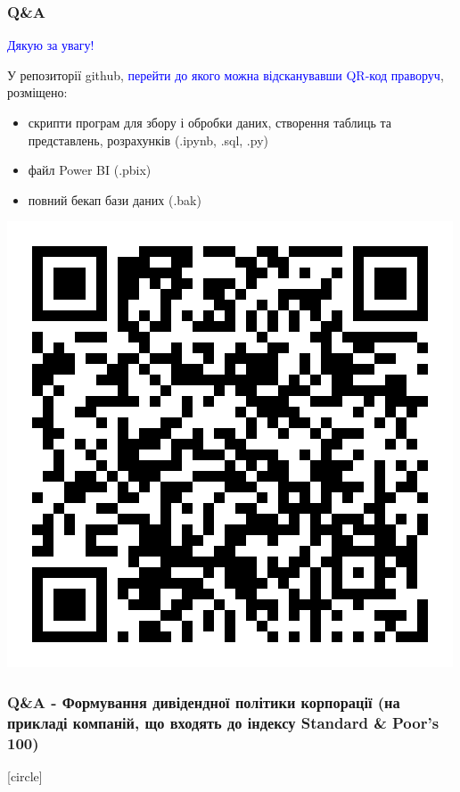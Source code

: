 \documentclass[aspectratio=169]{beamer}
\begin{document}
\begin{frame}
\frametitle{Q\&A}
\begin{center}
\bigskip
\textcolor{blue}{\huge Дякую за увагу!} \\
\end{center}
\begin{multicols}{2}

\vbox{\vspace{0.1cm}}
У репозиторії github, \textcolor{blue}{перейти до якого можна відсканувавши QR-код праворуч}, розміщено:
\begin{itemize}
\item скрипти програм для збору і обробки даних, створення таблиць та представлень, розрахунків (.ipynb, .sql, .py)
\item файл Power BI (.pbix)
\item повний бекап бази даних (.bak) 
\end{itemize}
\columnbreak
\hspace{5mm}
\includegraphics[scale=0.35]{QR code.png}
\end{multicols}
\end{frame}

\begin{frame}
\frametitle {Q\&A - Формування дивідендної політики корпорації (на прикладі компаній, що входять до індексу Standard \& Poor's 100)}
[circle]
\tableofcontents
\end{frame}
\end{document}
